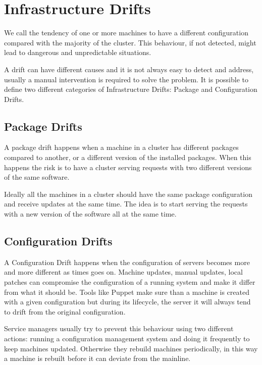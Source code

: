 \section{Infrastructure Drifts}

We call  the tendency of one or more machines
to have a different configuration compared with the majority of the
cluster. This behaviour, if not detected, might lead to dangerous and
unpredictable situations.

A drift can have different causes and it is not always easy to detect and
address, usually a manual intervention is required to solve the problem.
It is possible to define two different categories of Infrastructure
Drifts: Package and Configuration Drifts.

\subsection{Package Drifts}

A package drift happens when a machine in a cluster has different packages
compared to another, or a different version of the installed packages.
When this happens the risk is to have a cluster serving requests with two
different versions of the same software.

Ideally all the machines in a cluster should have the same package
configuration and receive updates at the same time. The idea is to start
serving the requests with a new version of the software all at the same
time. 

\subsection{Configuration Drifts}

A Configuration Drift happens when the configuration of servers becomes
more and more different as times goes on. Machine updates, manual updates,
local patches can compromise the configuration of a running system and
make it differ from what it should be. Tools like Puppet make sure than
a machine is created with a given configuration but during its lifecycle,
the server it will always tend to drift from the original configuration.

Service managers usually try to prevent this behaviour using two different
actions: running a configuration management system and doing it frequently
to keep machines updated. Otherwise they rebuild machines periodically, in
this way a machine is rebuilt before it can deviate from the mainline.
